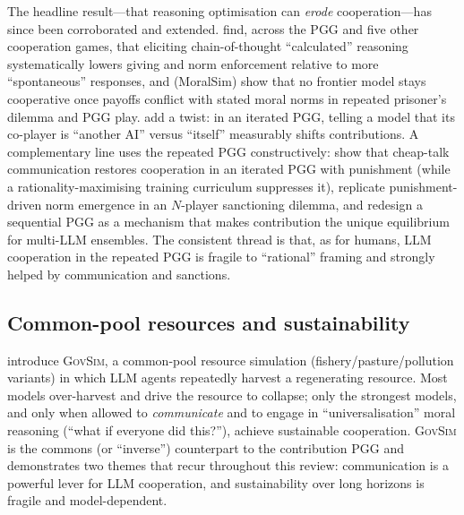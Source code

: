 \documentclass[11pt,a4paper]{article}
\begin{document}
The headline result---that reasoning optimisation can \emph{erode}
cooperation---has since been corroborated and extended. \citet{li2025spontaneous}
find, across the PGG and five other cooperation games, that eliciting
chain-of-thought ``calculated'' reasoning systematically lowers giving and norm
enforcement relative to more ``spontaneous'' responses, and
\citet{backmann2025moralsim} (MoralSim) show that no frontier model stays
cooperative once payoffs conflict with stated moral norms in repeated prisoner's
dilemma and PGG play. \citet{long2025mirror} add a twist: in an iterated PGG,
telling a model that its co-player is ``another AI'' versus ``itself''
measurably shifts contributions. A complementary line uses the repeated PGG
constructively: \citet{madmoun2025communication} show that cheap-talk
communication restores cooperation in an iterated PGG with punishment (while a
rationality-maximising training curriculum suppresses it),
\citet{warnakulasuriya2025evolution} replicate punishment-driven norm emergence in
an $N$-player sanctioning dilemma, and \citet{liang2025everyone} redesign a
sequential PGG as a mechanism that makes contribution the unique equilibrium for
multi-LLM ensembles. The consistent thread is that, as for humans, LLM cooperation
in the repeated PGG is fragile to ``rational'' framing and strongly helped by
communication and sanctions.

\subsection{Common-pool resources and sustainability}

\citet{piatti2024govsim} introduce \textsc{GovSim}, a common-pool resource
simulation (fishery/pasture/pollution variants) in which LLM agents repeatedly
harvest a regenerating resource. Most models over-harvest and drive the resource
to collapse; only the strongest models, and only when allowed to \emph{communicate}
and to engage in ``universalisation'' moral reasoning (``what if everyone did
this?''), achieve sustainable cooperation. \textsc{GovSim} is the commons (or
``inverse'') counterpart to the contribution PGG and demonstrates two themes that
recur throughout this review: communication is a powerful lever for LLM
cooperation, and sustainability over long horizons is fragile and
model-dependent.
\end{document}
